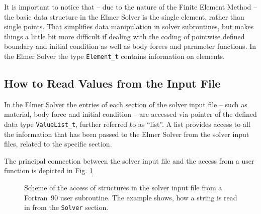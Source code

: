 It is important to notice that -- due to the nature of the Finite Element Method -- the basic data structure in the Elmer Solver is the single element, rather than single points. That simplifies data manipulation in solver subroutines, but makes things a little bit more difficult if dealing with the coding of pointwise defined boundary and initial condition as well as body forces and parameter functions. In the Elmer Solver the type \texttt{Element\_t} contains information on elements.
\subsection{How to Read Values from the Input File}
In the Elmer Solver the entries of each section of the solver input file -- such as material, body force and initial condition --  are accessed via pointer of the defined data type \texttt{ValueList\_t}, further referred to as ``list''. A list provides access to all the information that has been passed to the Elmer Solver from the solver input files, related to the specific section. 

The principal connection between the solver input file and the access from a user function is depicted in Fig. \ref{fig:sif_code}
\begin{figure}[tbhp]
\begin{center}
\caption{\label{fig:sif_code} Scheme of the access of structures in the solver input file from a Fortran~90 user subroutine. The example shows, how a string is read in from the \texttt{Solver} section.}
\end{center}
\end{figure}
